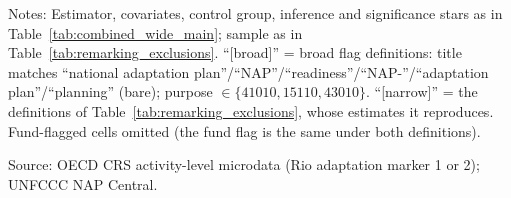 \begin{table}[H]
\centering
\caption{Sensitivity of the exclusion ATTs to the title and purpose flag definitions}
\label{tab:remarking_exclusions_regex_comparison}
\begingroup\small
{}
\endgroup
\par\vspace{4pt}
\begin{minipage}{\linewidth}\footnotesize
Notes: Estimator, covariates, control group, inference and significance stars as in Table~\ref{tab:combined_wide_main}; sample as in Table~\ref{tab:remarking_exclusions}. ``[broad]'' = broad flag definitions: title matches ``national adaptation plan''/``NAP''/``readiness''/``NAP-''/``adaptation plan''/``planning'' (bare); purpose $\in\{41010,15110,43010\}$. ``[narrow]'' = the definitions of Table~\ref{tab:remarking_exclusions}, whose estimates it reproduces. Fund-flagged cells omitted (the fund flag is the same under both definitions).\par
Source: OECD CRS activity-level microdata (Rio adaptation marker 1 or 2); UNFCCC NAP Central.
\end{minipage}
\end{table}
